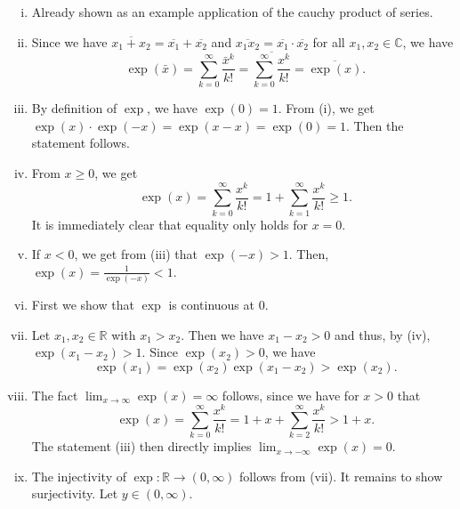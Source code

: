  \begin{enumerate}[(i)]
  \item Already shown as an example application of the cauchy product of series.
\item Since we have $\overline{x_1+x_2}=\overline{x_1}+\overline{x_2}$ and $\overline{x_1x_2}=\overline{x_1} \cdot  \overline{x_2}$ for all $x_1,x_2\in\mathbb{C}$, we have
\[\exp(\bar{x})=\sum_{k=0}^\infty\frac{\bar{x}^k}{k!}=\overline{\sum_{k=0}^\infty\frac{{x}^k}{k!}}=\overline{\exp(x)}.\]
\item By definition of $\exp$, we have $\exp(0)=1$. From (i), we get $\exp(x)\cdot\exp(-x)=\exp(x-x)=\exp(0)=1$. Then the statement follows.
\item From $x\geq0$, we get
\[\exp(x)=\sum_{k=0}^\infty\frac{x^k}{k!}=1+\sum_{k=1}^\infty\frac{x^k}{k!}\geq1.\]
It is immediately clear that equality only holds for $x=0$.
\item If $x<0$, we get from (iii) that $\exp(-x)>1$. Then, $\exp(x)=\frac1{\exp(-x)}<1$.
\item First we show that $\exp$ is continuous at $0$.
\item Let $x_1,x_2\in\mathbb{R}$ with $x_1> x_2$. Then we have $x_1-x_2>0$ and thus, by (iv), $\exp(x_1-x_2)>1$. Since $\exp(x_2)>0$, we have
\[\exp(x_1)=\exp(x_2)\exp(x_1-x_2)>\exp(x_2).\]
\item The fact $\lim_{x\to\infty}\exp(x)=\infty$ follows, since we have for $x>0$ that
\[\exp(x)=\sum_{k=0}^\infty\frac{x^k}{k!}=1+x+\sum_{k=2}^\infty\frac{x^k}{k!}>1+x.\]
The statement (iii) then directly implies $\lim_{x\to-\infty}\exp(x)=0$.
\item The injectivity of $\exp:\mathbb{R}\to(0,\infty)$ follows from (vii). It remains to show surjectivity. Let $y\in(0,\infty)$.\\

\end{enumerate}

